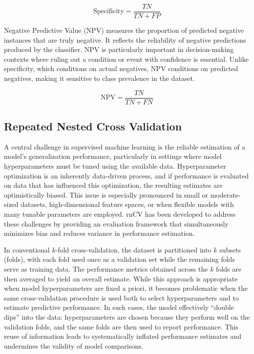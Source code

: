 \documentclass[en]{dimscthesis}
\begin{document}
\begin{equation}
	\text{Specificity}
	= \frac{TN}{TN + FP}
\end{equation}

Negative Predictive Value (NPV) measures the proportion of predicted negative instances that are truly negative. It reflects the reliability of negative predictions produced by the classifier. NPV is particularly important in decision-making contexts where ruling out a condition or event with confidence is essential. Unlike specificity, which conditions on actual negatives, NPV conditions on predicted negatives, making it sensitive to class prevalence in the dataset. 

\begin{equation}
	\text{NPV}
	= \frac{TN}{TN + FN}
\end{equation}

\subsection{Repeated Nested Cross Validation} \label{rncv}

A central challenge in supervised machine learning is the reliable estimation of a model’s generalization performance, particularly in settings where model hyperparameters must be tuned using the available data. Hyperparameter optimization is an inherently data-driven process, and if performance is evaluated on data that has influenced this optimization, the resulting estimates are optimistically biased. This issue is especially pronounced in small or moderate-sized datasets, high-dimensional feature spaces, or when flexible models with many tunable parameters are employed. rnCV has been developed to address these challenges by providing an evaluation framework that simultaneously minimizes bias and reduces variance in performance estimation.

In conventional $k$-fold cross-validation, the dataset is partitioned into $k$ subsets (folds), with each fold used once as a validation set while the remaining folds serve as training data. The performance metrics obtained across the $k$ folds are then averaged to yield an overall estimate. While this approach is appropriate when model hyperparameters are fixed a priori, it becomes problematic when the same cross-validation procedure is used both to select hyperparameters and to estimate predictive performance. In such cases, the model effectively “double dips” into the data: hyperparameters are chosen because they perform well on the validation folds, and the same folds are then used to report performance. This reuse of information leads to systematically inflated performance estimates and undermines the validity of model comparisons.
\end{document}
